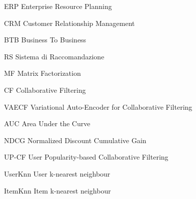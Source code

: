 
\begin{abbreviations}

\item[ERP] Enterprise Resource Planning
\item[CRM] Customer Relationship Management 
\item[BTB] Business To Business
\item[RS] Sistema di Raccomandazione
\item[MF] Matrix Factorization
\item[CF] Collaborative Filtering
\item[VAECF] Variational Auto-Encoder for Collaborative Filtering     
\item[AUC] Area Under the Curve
\item[NDCG] Normalized Discount Cumulative Gain
\item[UP-CF] User Popularity-based Collaborative Filtering
\item[UserKnn] User k-nearest neighbour
\item[ItemKnn] Item k-nearest neighbour
\end{abbreviations}